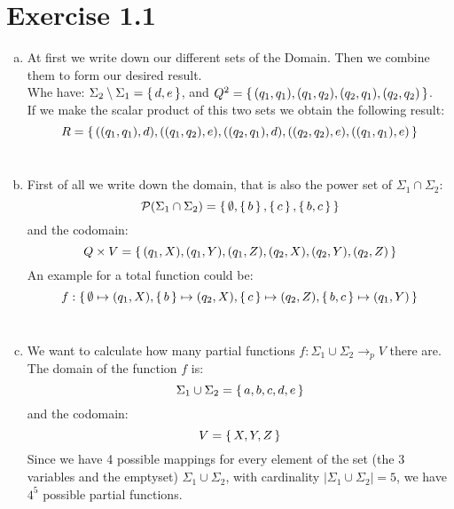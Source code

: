 \documentclass{article} %
\newcommand{\homeworkNumber}{1}
\begin{document}
\section*{Exercise \homeworkNumber.1}
\begin{enumerate}[(a)]
	\item
	At first we write down our different sets of the Domain. Then we combine them
	to form our desired result.\\
	Whe have: $\Sigma_2 \setminus \Sigma_1 = \set{d, e}$, and $Q^2 =
	\set{(q_1, q_1), (q_1, q_2), (q_2, q_1), (q_2, q_2)}$.\\
	If we make the scalar product of this two sets we obtain the following result:\\
	$$R = \set{((q_1, q_1), d), ((q_1, q_2), e), ((q_2, q_1), d), ((q_2, q_2), e),
	((q_1, q_1), e)}$$\\

	\item
	First of all we write down the domain, that is also the power set of
	$\Sigma_1 \cap \Sigma_2$:
	$$\mathcal{P}(\Sigma_1 \cap \Sigma_2) = \set{\emptyset, \set{b}, \set{c},
	\set{b, c}}$$ and the codomain:
	$$Q \times V = \set{(q_1, X), (q_1, Y), (q_1, Z), (q_2, X), (q_2, Y), (q_2, Z)}$$
	An example for a total function could be:
	$$f: \set{\emptyset \mapsto (q_1, X), \set{b} \mapsto (q_2, X), \set{c} \mapsto (q_2, Z), \set{b, c} \mapsto (q_1, Y)}$$\\

	\item
	We want to calculate how many partial functions $f: \Sigma_1 \cup \Sigma_2 \to_p V$
	there are.\\
	The domain of the function $f$ is: $$\Sigma_1 \cup \Sigma_2 =
	\set{a, b, c, d, e}$$
	and the codomain: $$V = \set{X, Y, Z}$$
	Since we have 4 possible mappings for every element of the set (the 3 variables and the emptyset) $\Sigma_1 \cup \Sigma_2$, with cardinality $|\Sigma_1 \cup \Sigma_2| = 5$,
	we have $4^5$ possible partial functions.
\end{enumerate}

\clearpage
\end{document}
